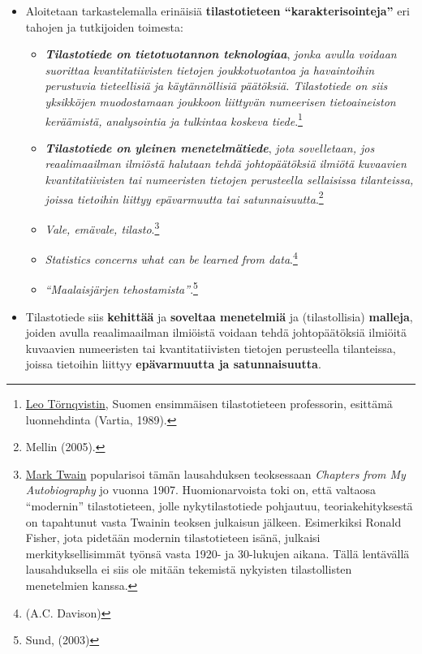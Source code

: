 \documentclass[
]{book}
\providecommand{\tightlist}{%
  \setlength{\itemsep}{0pt}\setlength{\parskip}{0pt}}
\begin{document}
\begin{itemize}
\tightlist
\item
  Aloitetaan tarkastelemalla erinäisiä \textbf{tilastotieteen ``karakterisointeja''} eri tahojen ja tutkijoiden toimesta:

  \begin{itemize}
  \tightlist
  \item
    \textbf{\emph{Tilastotiede on tietotuotannon teknologiaa}}, \emph{jonka avulla voidaan suorittaa kvantitatiivisten tietojen joukkotuotantoa ja havaintoihin perustuvia tieteellisiä ja käytännöllisiä päätöksiä. Tilastotiede on siis yksikköjen muodostamaan joukkoon liittyvän numeerisen tietoaineiston keräämistä, analysointia ja tulkintaa koskeva tiede}.\footnote{\href{https://fi.wikipedia.org/wiki/Leo_T\%C3\%B6rnqvist}{Leo Törnqvistin}, Suomen ensimmäisen tilastotieteen professorin, esittämä luonnehdinta (Vartia, 1989).}
  \item
    \textbf{\emph{Tilastotiede on yleinen menetelmätiede}}, \emph{jota sovelletaan, jos reaalimaailman ilmiöstä halutaan tehdä johtopäätöksiä ilmiötä kuvaavien kvantitatiivisten tai numeeristen tietojen perusteella sellaisissa tilanteissa, joissa tietoihin liittyy epävarmuutta tai satunnaisuutta}.\footnote{Mellin (2005).}
  \item
    \emph{Vale, emävale, tilasto}.\footnote{\href{https://fi.wikipedia.org/wiki/Mark_Twain}{Mark Twain} popularisoi tämän lausahduksen teoksessaan \emph{Chapters from My Autobiography} jo vuonna 1907. Huomionarvoista toki on, että valtaosa ``modernin'' tilastotieteen, jolle nykytilastotiede pohjautuu, teoriakehityksestä on tapahtunut vasta Twainin teoksen julkaisun jälkeen. Esimerkiksi Ronald Fisher, jota pidetään modernin tilastotieteen isänä, julkaisi merkityksellisimmät työnsä vasta 1920- ja 30-lukujen aikana. Tällä lentävällä lausahduksella ei siis ole mitään tekemistä nykyisten tilastollisten menetelmien kanssa.}
  \item
    \emph{Statistics concerns what can be learned from data}.\footnote{(A.C. Davison)}
  \item
    \emph{``Maalaisjärjen tehostamista''}.\footnote{Sund, (2003)}
  \end{itemize}
\item
  Tilastotiede siis \textbf{kehittää} ja \textbf{soveltaa menetelmiä} ja (tilastollisia) \textbf{malleja}, joiden avulla reaalimaailman ilmiöistä voidaan tehdä johtopäätöksiä ilmiöitä kuvaavien numeeristen tai kvantitatiivisten tietojen perusteella tilanteissa, joissa tietoihin liittyy \textbf{epävarmuutta ja satunnaisuutta}.


\end{itemize}
\end{document}
